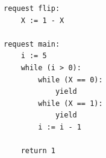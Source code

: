 \vspace{1em}  
\begin{figure}
	  \vspace{-1em}  %
	\centering
	\begin{lstlisting}[caption={Not serializable},label={lst:ComplexWhileNonSer},numbers=none]
request flip: 
    X := 1 - X 

request main:
    i := 5
    while (i > 0):
        while (X == 0):
            yield
        while (X == 1):
            yield
        i := i - 1

    return 1        
	\end{lstlisting}
\vspace{-0.5em}  %
\end{figure}
\vspace{1em}  %




%		    
%		        
%		
%		
	


